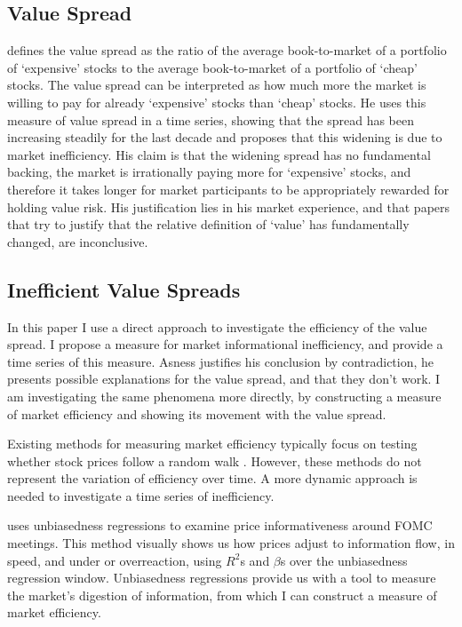 \subsection{Value Spread}
\citet{asness_2024} defines the value spread as the ratio of the average book-to-market of a portfolio of `expensive' stocks to the average book-to-market of
a portfolio of `cheap' stocks. The value spread can be interpreted as how much more the market is willing to pay for 
already `expensive' stocks than `cheap' stocks. He uses this measure of value spread in a time series, showing that the spread has been increasing steadily for the last decade
and proposes that this widening is due to market inefficiency. His claim is that the widening spread has no fundamental backing, the market is irrationally paying
more for `expensive' stocks, and therefore it takes longer for market participants to be appropriately rewarded for holding value risk.
His justification lies in his market experience, and that papers that try to justify that the relative definition of `value' has fundamentally changed, are inconclusive.

\subsection{Inefficient Value Spreads}
In this paper I use a direct approach to investigate the efficiency of the value spread. I propose a measure for market informational inefficiency, and provide a time series
of this measure. Asness justifies his conclusion by contradiction, he presents possible explanations for the value spread, and that they don't work. I am investigating
the same phenomena more directly, by constructing a measure of market efficiency and showing its movement with the value spread.

Existing methods for measuring market efficiency typically focus on testing whether stock prices follow a random walk
\citep{fama_random_walk} \citep{lim_brooks_2010}. However, these methods do not represent the variation of efficiency over time.
A more dynamic approach is needed to investigate a time series of inefficiency.

\citet{boguth_2023} uses unbiasedness regressions to examine price informativeness around FOMC meetings. 
This method visually shows us how prices adjust to information flow, in speed, and under or overreaction, using $R^2$s and $\beta$s over the unbiasedness regression window.
Unbiasedness regressions provide us with a tool to measure the market's digestion of information, from which I can construct a measure of market efficiency.

